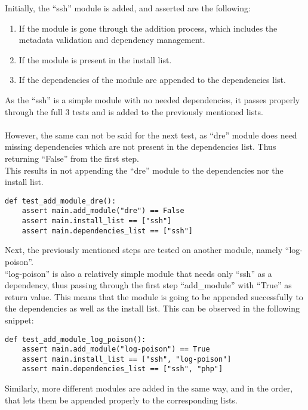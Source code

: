 Initially, the “ssh” module is added, and asserted are the following:
\begin{enumerate}
  \item If the module is gone through the addition process, which includes the metadata validation and dependency management.
  \item If the module is present in the install list.
  \item If the dependencies of the module are appended to the dependencies list.
\end{enumerate}

As the “ssh” is a simple module with no needed dependencies, it passes properly through the full 3 tests and is added to the previously mentioned lists.\\
\\
However, the same can not be said for the next test, as “dre” module does need missing dependencies which are not present in the dependencies list. Thus returning “False” from the first step.\\
This results in not appending the “dre” module to the dependencies nor the install list.

\begin{lstlisting}[caption=test\_add\_module\_dre, style=pythonstyle]
def test_add_module_dre():
    assert main.add_module("dre") == False
    assert main.install_list == ["ssh"]
    assert main.dependencies_list == ["ssh"]
\end{lstlisting}

Next, the previously mentioned steps are tested on another module, namely “log-poison”.\\
“log-poison” is also a relatively simple module that needs only “ssh” as a dependency, thus passing through the first step “add\_module” with “True” as return value. This means that the module is going to be appended successfully to the dependencies as well as the install list.
This can be observed in the following snippet:

\begin{lstlisting}[caption=test\_add\_module\_log-poison, style=pythonstyle]
def test_add_module_log_poison():
    assert main.add_module("log-poison") == True
    assert main.install_list == ["ssh", "log-poison"]
    assert main.dependencies_list == ["ssh", "php"]
\end{lstlisting}

Similarly, more different modules are added in the same way, and in the order, that lets them be appended properly to the corresponding lists.

